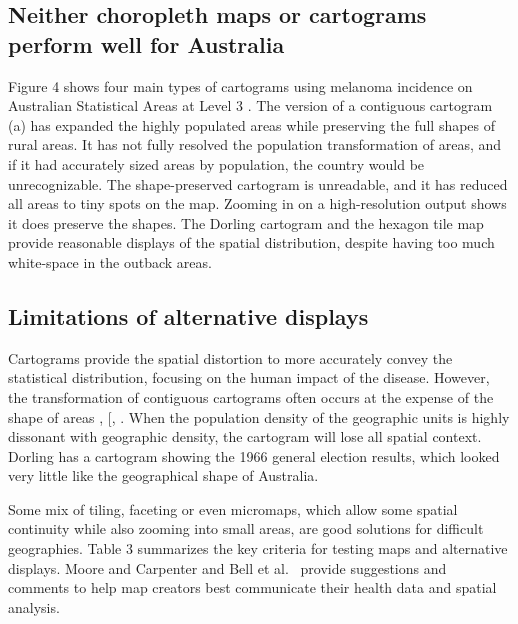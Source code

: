 \documentclass{monashthesis}
\begin{document}
\hypertarget{neither-choropleth-maps-or-cartograms-perform-well-for-australia}{%
\subsection{Neither choropleth maps or cartograms perform well for Australia}\label{neither-choropleth-maps-or-cartograms-perform-well-for-australia}}

Figure 4 shows four main types of cartograms using melanoma incidence on Australian Statistical Areas at Level 3 \autocite{abs2016}. The version of a contiguous cartogram (a) has expanded the highly populated areas while preserving the full shapes of rural areas. It has not fully resolved the population transformation of areas, and if it had accurately sized areas by population, the country would be unrecognizable. The shape-preserved cartogram is unreadable, and it has reduced all areas to tiny spots on the map. Zooming in on a high-resolution output shows it does preserve the shapes. The Dorling cartogram and the hexagon tile map provide reasonable displays of the spatial distribution, despite having too much white-space in the outback areas.

\hypertarget{limitations-of-alternative-displays}{%
\subsection{Limitations of alternative displays}\label{limitations-of-alternative-displays}}

Cartograms provide the spatial distortion to more accurately convey the statistical distribution, focusing on the human impact of the disease. However, the transformation of contiguous cartograms often occurs at the expense of the shape of areas \autocite{CBATCC}, {[}\textcite{NAC}, \autocite{TAAM}. When the population density of the geographic units is highly dissonant with geographic density, the cartogram will lose all spatial context. Dorling \autocite{ACTUC} has a cartogram showing the 1966 general election results, which looked very little like the geographical shape of Australia.

Some mix of tiling, faceting or even micromaps, which allow some spatial continuity while also zooming into small areas, are good solutions for difficult geographies. Table 3 summarizes the key criteria for testing maps and alternative displays. Moore and Carpenter \autocite{SAMGIS} and Bell et al.~\autocite{CPISACA} provide suggestions and comments to help map creators best communicate their health data and spatial analysis.
\end{document}
